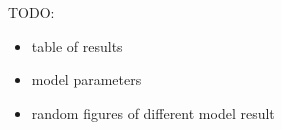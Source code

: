 TODO:
\begin{itemize}
\item table of results
\item model parameters
\item random figures of different model result
\end{itemize}

